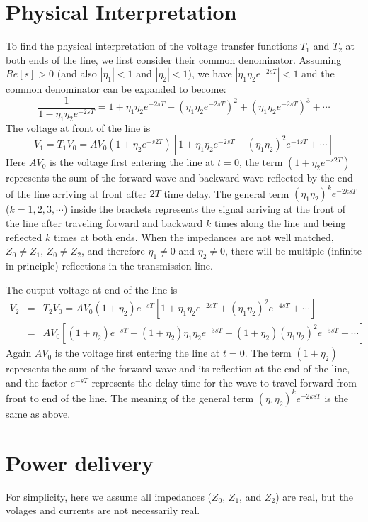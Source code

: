 \section*{Physical Interpretation}

To find the physical interpretation of the voltage transfer functions
$T_1$ and $T_2$ at both ends of the line, we first consider their common
denominator. Assuming $Re[s]>0$ (and also $|\eta_1|<1$ and $|\eta_2|<1$), 
we have $|\eta_1\eta_2e^{-2sT}|<1$ and the common denominator can be 
expanded to become:
\[	\frac{1}{1-\eta_1\eta_2e^{-2sT}}=1+\eta_1\eta_2e^{-2sT}
	+(\eta_1\eta_2e^{-2sT})^2+(\eta_1\eta_2e^{-2sT})^3+\cdots 
\]
The voltage at front of the line is
\[ V_1=T_1V_0=AV_0(1+\eta_2e^{-s2T})[1+\eta_1\eta_2e^{-2sT}
	+(\eta_1\eta_2)^2e^{-4sT}+\cdots ]	\]
Here $AV_0$ is the voltage first entering the line at $t=0$, the term 
$(1+\eta_2 e^{-s2T})$ represents the sum of the forward wave and backward
wave reflected by the end of the line arriving at front after $2T$ time
delay. The general term $(\eta_1\eta_2)^ke^{-2ksT}$ ($k=1,2,3, \cdots$) 
inside the brackets represents the signal arriving at the front of the 
line after traveling forward and backward $k$ times along the line and 
being reflected $k$ times at both ends. When the impedances are not well 
matched, $Z_0\ne Z_1$, $Z_0\ne Z_2$, and therefore $\eta_1\ne 0$ and 
$\eta_2\ne 0$, there will be multiple (infinite in principle) reflections 
in the transmission line.

The output voltage at end of the line is 
\begin{eqnarray}
V_2 &=& T_2V_0=AV_0(1+\eta_2)e^{-sT}[1+\eta_1\eta_2e^{-2sT}
	+(\eta_1\eta_2)^2e^{-4sT}+\cdots ]
	\nonumber \\
 &=& AV_0 [ (1+\eta_2)e^{-sT}+(1+\eta_2)\eta_1\eta_2e^{-3sT}+
	(1+\eta_2)(\eta_1\eta_2)^2e^{-5sT}+ \cdots ]
	\nonumber 
\end{eqnarray}
Again $AV_0$ is the voltage first entering the line at $t=0$. The term 
$(1+\eta_2)$ represents the sum of the forward wave and its reflection at
the end of the line, and the factor $e^{-sT}$ represents the delay time for 
the wave to travel forward from front to end of the line. The meaning of the
general term $(\eta_1\eta_2)^ke^{-2ksT}$ is the same as above. 

\section*{Power delivery}

For simplicity, here we assume all impedances ($Z_0$, $Z_1$, and $Z_2$) 
are real, but the volages and currents are not necessarily real.

